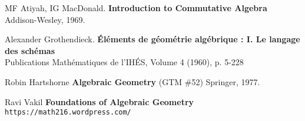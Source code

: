 \documentclass[12pt]{article}
\begin{document}
\begin{thebibliography}{}

\item MF Atiyah, IG MacDonald.  \textbf{Introduction to Commutative Algebra}  Addison-Wesley, 1969.

\item Alexander Grothendieck. \textbf{\'{E}l\'{e}ments de g\'{e}om\'{e}trie alg\'{e}brique : I. Le langage des sch\'{e}mas} \\
Publications Mathématiques de l'IHÉS,  Volume 4  (1960),  p. 5-228

\item Robin Hartshorne \textbf{Algebraic Geometry} (GTM \#52) Springer, 1977.

\item Ravi Vakil \textbf{Foundations of Algebraic Geometry} \texttt{https://math216.wordpress.com/} 

\end{thebibliography}
\end{document}
